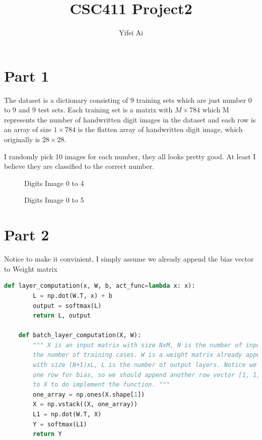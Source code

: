 \documentclass[12pt]{article}
\begin{document}
\title{CSC411 Project2}
\author{Yifei Ai}
\date{}
\maketitle
\section*{Part 1}
The dataset is a dictionary consisting of 9 training sets which are just number 0 to 9 and 9 test sets. Each training set is a matrix with $M\times 784$ which M represents the number of handwritten digit images in the dataset and each row is an array of size $1\times 784$ is the flatten array of handwritten digit image, which originally is $28\times 28$.

I randomly pick 10 images for each number, they all looks pretty good. At least I believe they are classified to the correct number.
\begin{figure}[h]
    \caption{Digits Image 0 to 4}
\end{figure}
\begin{figure}[h]
    \caption{Digits Image 0 to 5}
\end{figure}
\section*{Part 2}
Notice to make it convinient, I simply assume we already append the bias vector to Weight matrix
\begin{lstlisting}[language=Python]
    def layer_computation(x, W, b, act_func=lambda x: x):
        L = np.dot(W.T, x) + b
      	output = softmax(L)
      	return L, output

    def batch_layer_computation(X, W):
        """ X is an input matrix with size NxM, N is the number of input units, M is
        the number of training cases. W is a weight matrix already append bias vector 
        with size (N+1)xL, L is the number of output layers. Notice we need extra 
        one row for bias, so we should append another row vector [1, 1, 1, 1, ... ,1] 
        to X to do implement the function. """
        one_array = np.ones(X.shape[1])
        X = np.vstack((X, one_array))
        L1 = np.dot(W.T, X)
        Y = softmax(L1)
        return Y
\end{lstlisting}
\end{document}
